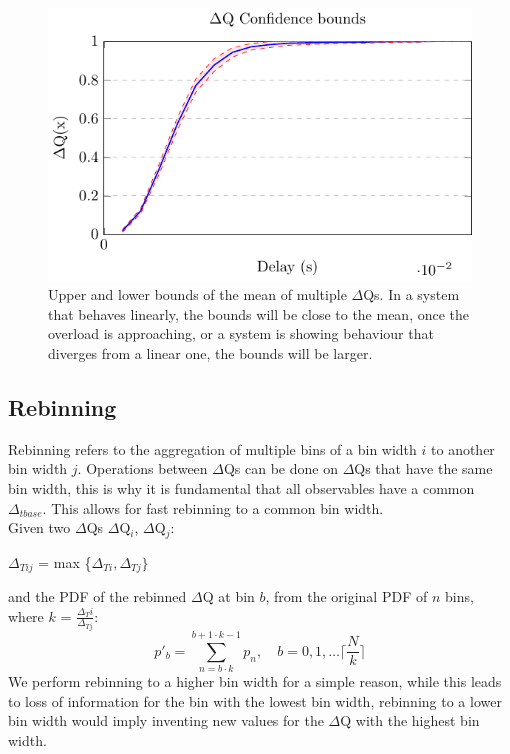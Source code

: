         \begin{figure}[H]
            \begin{center}
                \includegraphics[scale=1.2]{tikz/ci.pdf} 
            \end{center}
            \caption{Upper and lower bounds of the mean of multiple $\Delta$Qs. In a system that behaves linearly, the bounds will be close to the mean, once the overload is approaching, or a system is showing behaviour that diverges from a linear one, the bounds will be larger.}
        \end{figure}
    \subsection{Rebinning}
        Rebinning refers to the aggregation of multiple bins of a bin width $i$ to another bin width $j$. 
        Operations between $\Delta$Qs can be done on $\Delta$Qs that have the same bin width, this is why it is fundamental that all observables have a common $\Delta_{tbase}$. This allows for fast rebinning to a common bin width. \\
        Given two $\Delta$Qs $\Delta$Q$_i$, $\Delta$Q$_j$:
        \begin{center}
            $\Delta_{Tij}$ = max \{$\Delta_{Ti}, \Delta_{Tj} \}$
        \end{center}
        and the PDF of the rebinned $\Delta$Q at bin $b$, from the original PDF of $n$ bins, where $k$ = $\frac{\Delta{_Ti}}{\Delta_{Tj}}$:
        \begin{equation}
            p'_b = \sum_{n=b \cdot k}^{b+ 1 \cdot k - 1} p_n, \quad b=0,1,\dots \lceil \frac{N}{k} \rceil  
        \end{equation}
        We perform rebinning to a higher bin width for a simple reason, while this leads to loss of information for the bin with the lowest bin width, rebinning to a lower bin width would imply inventing new values for the $\Delta$Q with the highest bin width.
       
